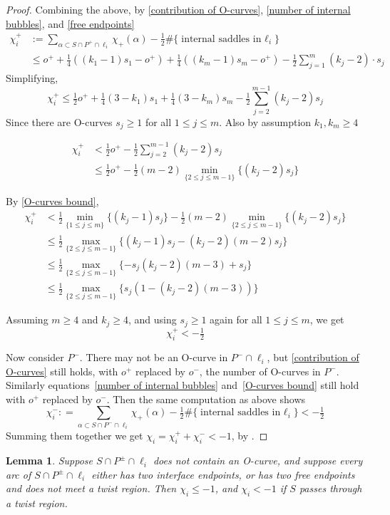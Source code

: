 \documentclass[12pt,reqno]{amsart}
\theoremstyle{plain}
\newtheorem{lemma}[theorem]{Lemma}
\theoremstyle{definition}
\begin{document}
\begin{proof}
Combining the above, by \eqref{contribution of O-curves}, \eqref{number of internal bubbles}, 
and \eqref{free endpoints}
\begin{align*}
\chi_i^+ & := \sum_{\alpha \subset S\cap P^+\cap \ell_i}\chi_+(\alpha) -\tfrac12\#
\{\text{internal saddles in $\ell_i$}\} \\
&\le o^+ + \tfrac14((k_1-1)s_1 - o^+) + \tfrac14((k_m-1)s_m - o^+) - \tfrac12
\sum_{j=1}^m (k_j-2)\cdot s_j
\end{align*}
Simplifying, 
\[ \chi_i^+ \leq 
\tfrac12 o^+ + \tfrac14(3-k_1)s_1 + \tfrac14(3-k_m)s_m - \tfrac12 \sum_{j=2}^{m-1}(k_j-2)s_j
\]
Since there are O-curves $s_j\ge 1$ for all $1\le j \le m$. Also by assumption $k_1, k_m\geq 4$ 

\begin{align*}
\chi_i^+ &< \tfrac12 o^+ - \tfrac12 \sum_{j=2}^{m-1}(k_j-2)s_j  \\
&  \leq \tfrac12 o^+ - \tfrac12(m-2) \min_{\{2\le j\le m-1\}}\{(k_j-2)s_j\} 
\end{align*}

By \eqref{O-curves bound}, 
\begin{align*}
\chi_i^+ &< \tfrac12 \min_{\{1\le j \le m\}}\{(k_j-1)s_j\} - \tfrac12(m-2) 
\min_{\{2\le j\le m-1\}}\{(k_j-2)s_j\} \\
& \leq \tfrac12\max_{\{2\le j \le m-1 \}} \{(k_j-1)s_j-(k_j-2)(m-2)s_j\} \\
& \leq \tfrac12\max_{\{2\le j \le m-1\}} \{ -s_j(k_j-2)(m-3)+s_j\}\\
&\le \tfrac12\max_{\{2\le j \le m-1\}} \{ s_j(1-(k_j-2)(m-3))\}
\end{align*}

Assuming $m\geq 4$ and $k_j\geq 4$, and using $s_j\ge 1$ again for all $1\le j \le m$, we get
\[ \chi_i^+ < -\tfrac12 \]

Now consider $P^-$. 
There may not be an O-curve in $P^-\cap \ell_i$, but \cref{contribution of O-curves} still 
holds, with $o^+$ replaced by $o^-$, the number of O-curves in $P^-$.  
Similarly equations~\eqref{number of internal bubbles} and~\eqref{O-curves bound} 
still hold with $o^+$ replaced by $o^-$. 
Then the same computation as above shows
\[
\chi^-_i: = \sum_{\alpha\subset S\cap P^-\cap \ell_i}\chi_+(\alpha) -\tfrac12\#\{\text{internal 
saddles in $\ell_i$}\}< -\tfrac12
\]
Summing them together we get $\chi_i = \chi^+_i+\chi^-_i<-1$, by 
.
\end{proof}

\begin{lemma}\label{lem:arc two interface neg chi}
Suppose $S\cap P^{\pm}\cap \ell_i$ does not contain an O-curve, and suppose every 
arc of $S\cap P^{\pm}\cap \ell_i$ either has two interface endpoints, or has two free 
endpoints and does not meet a twist region. Then $\chi_i\leq -1$, and $\chi_i<-1$ if 
$S$ passes through a twist region. 
\end{lemma}
\end{document}
